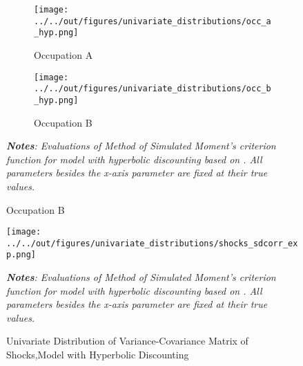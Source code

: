 
\begin{appendices} \label{appendix}



\begin{figure} 
\centering
\captionsetup{justification=centering}
\caption{Univariate Distribution of Wage Parameters,\newline Model with Hyperbolic Discounting}
\label{fig:univariate-hyp-others}
\begin{subfigure}{\textwidth}
\caption{Occupation A}
\texttt{[image: ../../out/figures/univariate\_distributions/occ\_a\_hyp.png]}
\end{subfigure}
\begin{subfigure}{\textwidth}
\caption{Occupation B}
\texttt{[image: ../../out/figures/univariate\_distributions/occ\_b\_hyp.png]}
\end{subfigure}

\bigskip
\footnotesize
\raggedright
\textit{\textbf{Notes}: Evaluations of Method of Simulated Moment's criterion function for model with hyperbolic discounting based on \textcite{KeaneWolpin1994}. All parameters besides the x-axis parameter are fixed at their true values.}
\end{figure}


\begin{figure} 
\centering
\captionsetup{justification=centering}
\caption{Univariate Distribution of Variance-Covariance Matrix of Shocks,\newline Model with Hyperbolic Discounting}
\label{fig:univariate-hyp-shocks}
\texttt{[image: ../../out/figures/univariate\_distributions/shocks\_sdcorr\_exp.png]}

\bigskip
\footnotesize
\raggedright
\textit{\textbf{Notes}: Evaluations of Method of Simulated Moment's criterion function for model with hyperbolic discounting based on \textcite{KeaneWolpin1994}. All parameters besides the x-axis parameter are fixed at their true values.}
\end{figure}

\end{appendices}





